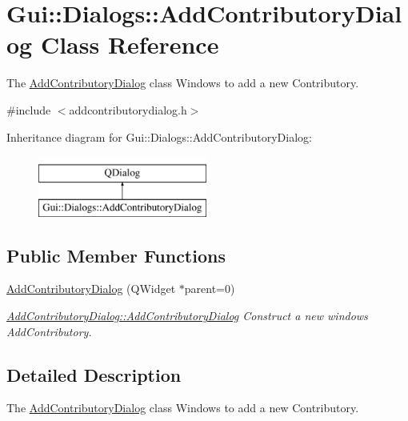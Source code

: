 \hypertarget{classGui_1_1Dialogs_1_1AddContributoryDialog}{\section{Gui\+:\+:Dialogs\+:\+:Add\+Contributory\+Dialog Class Reference}
\label{classGui_1_1Dialogs_1_1AddContributoryDialog}
}


The \hyperlink{classGui_1_1Dialogs_1_1AddContributoryDialog}{Add\+Contributory\+Dialog} class Windows to add a new Contributory.  




{\ttfamily \#include $<$addcontributorydialog.\+h$>$}

Inheritance diagram for Gui\+:\+:Dialogs\+:\+:Add\+Contributory\+Dialog\+:\begin{figure}[H]
\begin{center}
\leavevmode
\includegraphics[height=2.000000cm]{d5/de2/classGui_1_1Dialogs_1_1AddContributoryDialog}
\end{center}
\end{figure}
\subsection*{Public Member Functions}
\begin{DoxyCompactItemize}
\item 
\hyperlink{classGui_1_1Dialogs_1_1AddContributoryDialog_a40687642b2f2b15a61298ab18256867a}{Add\+Contributory\+Dialog} (Q\+Widget $\ast$parent=0)
\begin{DoxyCompactList}\small\item\em \hyperlink{classGui_1_1Dialogs_1_1AddContributoryDialog_a40687642b2f2b15a61298ab18256867a}{Add\+Contributory\+Dialog\+::\+Add\+Contributory\+Dialog} Construct a new windows Add\+Contributory. \end{DoxyCompactList}\end{DoxyCompactItemize}


\subsection{Detailed Description}
The \hyperlink{classGui_1_1Dialogs_1_1AddContributoryDialog}{Add\+Contributory\+Dialog} class Windows to add a new Contributory. 


